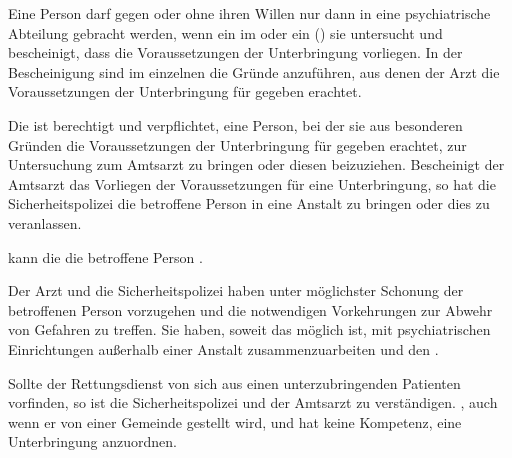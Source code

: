 {%
Eine Person darf gegen oder ohne ihren Willen nur dann in
eine psychiatrische Abteilung gebracht werden, wenn ein im
 oder ein
 () sie untersucht und
bescheinigt, dass die Voraussetzungen der Unterbringung
vorliegen. In der Bescheinigung sind im einzelnen die Gründe
anzuführen, aus denen der Arzt die Voraussetzungen der
Unterbringung für gegeben erachtet.



Die  ist berechtigt und verpflichtet,
eine Person, bei der sie aus besonderen Gründen die
Voraussetzungen der Unterbringung für gegeben erachtet, zur
Untersuchung zum Amtsarzt zu bringen oder diesen
beizuziehen. Bescheinigt der Amtsarzt das Vorliegen der
Voraussetzungen für eine Unterbringung, so hat die
Sicherheitspolizei die betroffene Person in eine Anstalt zu
bringen oder dies zu veranlassen.

 kann die 
die betroffene Person
.

Der Arzt und die Sicherheitspolizei haben unter möglichster
Schonung der betroffenen Person vorzugehen und die notwendigen
Vorkehrungen zur Abwehr von Gefahren zu treffen. Sie haben,
soweit das möglich ist, mit psychiatrischen Einrichtungen
außerhalb einer Anstalt zusammenzuarbeiten und
 den . 

Sollte der Rettungsdienst von sich aus einen
unterzubringenden Patienten vorfinden, so ist die
Sicherheitspolizei und der Amtsarzt zu verständigen.
, auch wenn
er von einer Gemeinde gestellt wird, und
hat keine Kompetenz, eine Unterbringung anzuordnen. 



}
{}
{}
{}
{}




